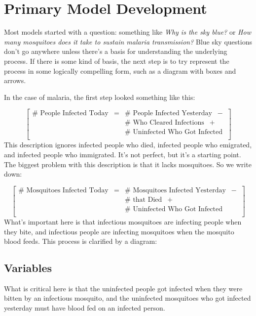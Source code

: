 \documentclass[
]{book}
\begin{document}
\hypertarget{primary-model-development}{%
\section{Primary Model Development}\label{primary-model-development}}

Most models started with a question: something like \emph{Why is the sky blue?} or \emph{How many mosquitoes does it take to sustain malaria transmission?} Blue sky questions don't go anywhere unless there's a basis for understanding the underlying process. If there is some kind of basis, the next step is to try represent the process in some logically compelling form, such as a diagram with boxes and arrows.

In the case of malaria, the first step looked something like this:

\[
\left[
\begin{array}{rcl}
\# \mbox{ People Infected Today} &=& \# \mbox{ People Infected Yesterday} \;\; -\\
&& \# \mbox{ Who Cleared Infections} \;\; + \\
&& \# \mbox{ Uninfected Who Got Infected}\\
\end{array} \right]
\]
This description ignores infected people who died, infected people who emigrated, and infected people who immigrated. It's not perfect, but it's a starting point. The biggest problem with this description is that it lacks mosquitoes. So we write down:

\[
\left[
\begin{array}{rcl}
\# \mbox{ Mosquitoes Infected Today} &=& \#\mbox{ Mosquitoes Infected Yesterday} \;\; -\\
&& \#\mbox{ that Died} \;\; + \\
&& \#\mbox{ Uninfected Who Got Infected}\\
\end{array} \right]
\]
What's important here is that infectious mosquitoes are infecting people when they bite, and infectious people are infecting mosquitoes when the mosquito blood feeds. This process is clarified by a diagram:

\hypertarget{variables-1}{%
\subsection{Variables}\label{variables-1}}

What is critical here is that the uninfected people got infected when they were bitten by an infectious mosquito, and the uninfected mosquitoes who got infected yesterday must have blood fed on an infected person.
\end{document}
